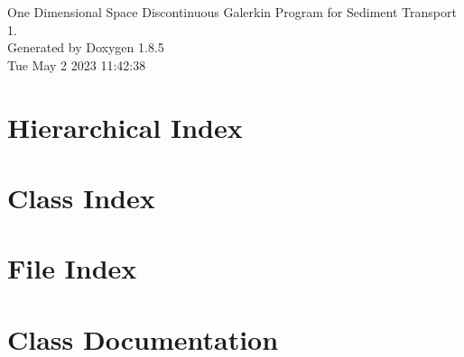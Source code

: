 \documentclass[twoside]{book}
\newcommand{\clearemptydoublepage}{%
  \newpage{\pagestyle{empty}\cleardoublepage}%
}
\begin{document}
\begin{titlepage}
\vspace*{7cm}
\begin{center}%
{\Large One Dimensional Space Discontinuous Galerkin Program for Sediment Transport \\[1ex]\large 1. }\\
\vspace*{1cm}
{\large Generated by Doxygen 1.8.5}\\
\vspace*{0.5cm}
{\small Tue May 2 2023 11:42:38}\\
\end{center}
\end{titlepage}
\clearemptydoublepage
\tableofcontents
\clearemptydoublepage
{}

\chapter{Hierarchical Index}

\chapter{Class Index}

\chapter{File Index}

\chapter{Class Documentation}
























\end{document}
